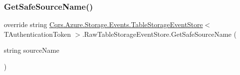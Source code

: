 \subsubsection{\texorpdfstring{Get\+Safe\+Source\+Name()}{GetSafeSourceName()}}
{\footnotesize\ttfamily override string \hyperlink{classCqrs_1_1Azure_1_1Storage_1_1Events_1_1TableStorageEventStore}{Cqrs.\+Azure.\+Storage.\+Events.\+Table\+Storage\+Event\+Store}$<$ T\+Authentication\+Token $>$.Raw\+Table\+Storage\+Event\+Store.\+Get\+Safe\+Source\+Name (\begin{DoxyParamCaption}\item[{string}]{source\+Name }\end{DoxyParamCaption})\hspace{0.3cm}{\ttfamily [protected]}}

